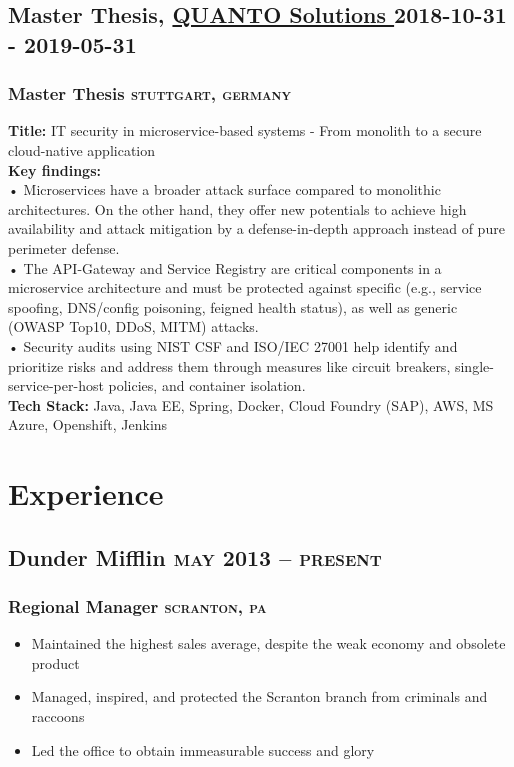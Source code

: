 \documentclass{article}
\newcommand{\rside}[1]{\hfill \normalfont\scshape\MakeLowercase{#1}}
\begin{document}
\subsection{ Master Thesis, \href{ https://www.linkedin.com/company/quanto-solutions/ }{ QUANTO Solutions } \rside{ 2018-10-31 - 2019-05-31 } }
\subsubsection{ Master Thesis \rside{ Stuttgart, Germany } }
\begin{flushleft}
\textbf{Title:} IT security in microservice-based systems - From monolith to a secure cloud-native application\\[1em]\textbf{Key findings:}\\• Microservices have a broader attack surface compared to monolithic architectures. On the other hand, they offer new potentials to achieve high availability and attack mitigation by a defense-in-depth approach instead of pure perimeter defense.\\• The API-Gateway and Service Registry are critical components in a microservice architecture and must be protected against specific (e.g., service spoofing, DNS/config poisoning, feigned health status), as well as generic (OWASP Top10, DDoS, MITM) attacks.\\• Security audits using NIST CSF and ISO/IEC 27001 help identify and prioritize risks and address them through measures like circuit breakers, single-service-per-host policies, and container isolation.\\[1em]\textbf{Tech Stack:} Java, Java EE, Spring, Docker, Cloud Foundry (SAP), AWS, MS Azure, Openshift, Jenkins
\end{flushleft}


\section{\faToolbox\enspace Experience}
\subsection{Dunder Mifflin \rside{May 2013 -- Present}}
\subsubsection{Regional Manager \rside{Scranton, PA}}
\begin{itemize}
  \item Maintained the highest sales average, despite the weak economy and obsolete product
  \item Managed, inspired, and protected the Scranton branch from criminals and raccoons
  \item Led the office to obtain immeasurable success and glory
\end{itemize}
\end{document}
